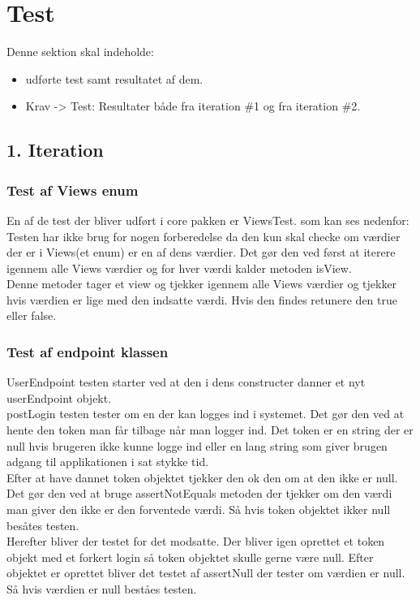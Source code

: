 \section{Test}
Denne sektion skal indeholde:

\begin{itemize}
    \item udførte test samt resultatet af dem. 
    \item Krav -> Test: Resultater både fra iteration \#1 og fra iteration \#2.
\end{itemize}{}

    \subsection{1. Iteration}

    \subsubsection{Test af Views enum}
    En af de test der bliver udført i core pakken er ViewsTest. som kan ses nedenfor:\\
    Testen har ikke brug for nogen forberedelse da den kun skal checke om værdier der er i Views(et enum) er en af dens værdier. Det gør den ved først at iterere igennem alle Views værdier og for hver værdi kalder metoden isView.\\
    Denne metoder tager et view og tjekker igennem alle Views værdier og tjekker hvis værdien er lige med den indsatte værdi. Hvis den findes retunere den true eller false.


    \subsubsection{Test af endpoint klassen}
    UserEndpoint testen starter ved at den i dens constructer danner et nyt userEndpoint objekt. \\
    postLogin testen tester om en der kan logges ind i systemet. Det gør den ved at hente den token man får tilbage når man logger ind. Det token er en string der er null hvis brugeren ikke kunne logge ind eller en lang string som giver brugen adgang til applikationen i sat stykke tid. \\
    Efter at have dannet token objektet tjekker den ok den om at den ikke er null. Det gør den ved at bruge assertNotEquals metoden der tjekker om den værdi man giver den ikke er den forventede værdi. Så hvis token objektet ikker null besåtes testen. \\
    Herefter bliver der testet for det modsatte. Der bliver igen oprettet et token objekt med et forkert login så token objektet skulle gerne være null. Efter objektet er oprettet bliver det testet af assertNull der tester om værdien er null. Så hvis værdien er null beståes testen. \\


